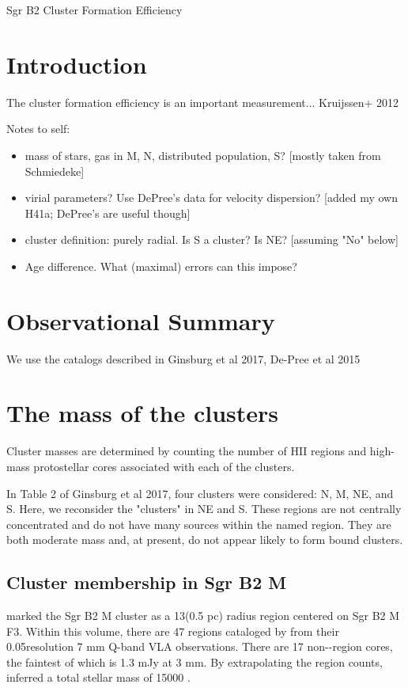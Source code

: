 \documentclass[twocolumn]{aastex61}
\begin{document}
Sgr B2 Cluster Formation Efficiency

\section{Introduction}

The cluster formation efficiency is an important measurement...
Kruijssen+ 2012

Notes to self:
\begin{itemize}
    \item mass of stars, gas in M, N, distributed population, S? [mostly taken from Schmiedeke]
    \item virial parameters?  Use DePree's data for velocity dispersion?  [added my own H41a; DePree's are useful though]
    \item cluster definition: purely radial.  Is S a cluster?  Is NE?  [assuming "No" below]
    \item Age difference.  What (maximal) errors can this impose?
\end{itemize}

\section{Observational Summary}


We use the catalogs described in Ginsburg et al 2017, De-Pree et al 2015


\section{The mass of the clusters}
Cluster masses are determined by counting the number of HII regions and high-mass
protostellar cores associated with each of the clusters.

In Table 2 of Ginsburg et al 2017, four clusters were considered: N, M, NE, and
S.  Here, we reconsider the "clusters" in NE and S.  These regions are not
centrally concentrated and do not have many sources within the named region.
They are both moderate mass and, at present, do not appear likely to form bound
clusters.

\subsection{Cluster membership in Sgr B2 M}
\citet{Schmiedeke2016a} marked the Sgr B2 M cluster as a 13\arcsec  (0.5 pc) radius
region centered on Sgr B2 M F3.  Within this volume, there are 47 \hii regions
cataloged by \citet{De-Pree201?} from their 0.05\arcsec resolution 7 mm Q-band
VLA observations.  There are 17 non-\hii-region cores, the faintest of which is
1.3 mJy at 3 mm.  By extrapolating the \hii region counts,
\citet{Ginsburg2017c} inferred a total stellar mass of 15000 \msun.
\end{document}
